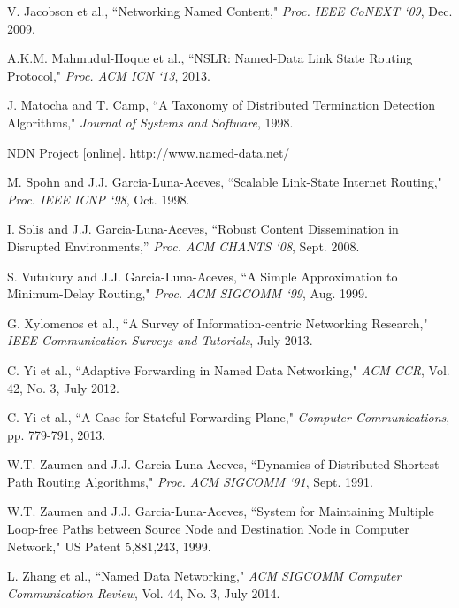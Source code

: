 \documentclass{ancs15-alternate}
\begin{document}
\begin{thebibliography}{99}
V. Jacobson et al., ``Networking Named Content," {\em Proc. IEEE CoNEXT `09}, Dec. 2009.	


A.K.M. Mahmudul-Hoque et al., ``NSLR: Named-Data Link State Routing Protocol," {\em Proc. ACM ICN `13}, 2013.


J. Matocha and T. Camp, ``A Taxonomy of Distributed Termination Detection Algorithms,"
{\em Journal of Systems and Software}, 1998. 

NDN Project [online]. http://www.named-data.net/

M. Spohn and J.J. Garcia-Luna-Aceves, ``Scalable Link-State Internet Routing,"
{\em Proc. IEEE ICNP `98}, Oct. 1998.

I. Solis and J.J. Garcia-Luna-Aceves, ``Robust Content Dissemination in Disrupted Environments,'' 
{\em Proc. ACM CHANTS `08}, Sept. 2008.

S. Vutukury and J.J. Garcia-Luna-Aceves, ``A Simple Approximation to Minimum-Delay Routing," {\em Proc. ACM SIGCOMM `99}, Aug. 1999.

G. Xylomenos et al., ``A Survey of Information-centric Networking Research,"  {\em IEEE Communication Surveys and Tutorials}, July 2013.


C. Yi et al., ``Adaptive Forwarding in Named Data Networking,"
{\em ACM CCR}, Vol. 42, No. 3, July 2012.

C. Yi et al., ``A Case for Stateful Forwarding Plane,"
{\em Computer Communications}, pp. 779-791, 2013.


W.T. Zaumen and J.J. Garcia-Luna-Aceves, ``Dynamics of Distributed Shortest-Path Routing Algorithms," 
{\em Proc. ACM SIGCOMM `91}, Sept. 1991.

W.T. Zaumen and J.J. Garcia-Luna-Aceves, 
``System for Maintaining Multiple Loop-free Paths between Source Node and Destination Node in Computer Network,"
US Patent 5,881,243, 1999.

L. Zhang et al., ``Named Data Networking," {\em ACM SIGCOMM Computer Communication Review}, Vol. 44, No. 3, July 2014.

\end{thebibliography}
\end{document}

